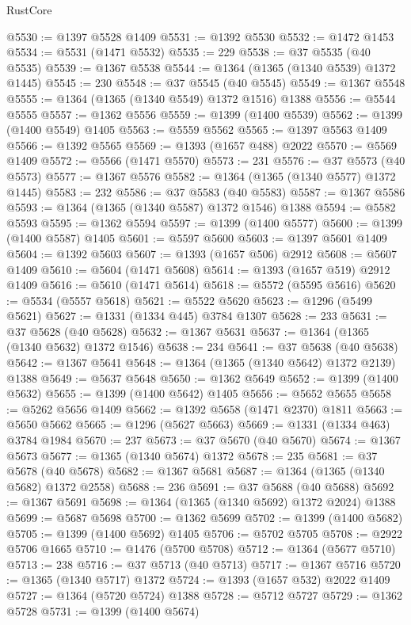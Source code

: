 \begin{lexlean}{RustCore}
\begin{coremodule}
@5530 := @1397 @5528 @1409
@5531 := @1392 @5530
@5532 := @1472 @1453
@5534 := @5531 (@1471 @5532)
@5535 := 229
@5538 := @37 @5535 (@40 @5535)
@5539 := @1367 @5538
@5544 := @1364 (@1365 (@1340 @5539) @1372 @1445)
@5545 := 230
@5548 := @37 @5545 (@40 @5545)
@5549 := @1367 @5548
@5555 := @1364 (@1365 (@1340 @5549) @1372 @1516) @1388
@5556 := @5544 @5555
@5557 := @1362 @5556
@5559 := @1399 (@1400 @5539)
@5562 := @1399 (@1400 @5549) @1405
@5563 := @5559 @5562
@5565 := @1397 @5563 @1409
@5566 := @1392 @5565
@5569 := @1393 (@1657 @488) @2022
@5570 := @5569 @1409
@5572 := @5566 (@1471 @5570)
@5573 := 231
@5576 := @37 @5573 (@40 @5573)
@5577 := @1367 @5576
@5582 := @1364 (@1365 (@1340 @5577) @1372 @1445)
@5583 := 232
@5586 := @37 @5583 (@40 @5583)
@5587 := @1367 @5586
@5593 := @1364 (@1365 (@1340 @5587) @1372 @1546) @1388
@5594 := @5582 @5593
@5595 := @1362 @5594
@5597 := @1399 (@1400 @5577)
@5600 := @1399 (@1400 @5587) @1405
@5601 := @5597 @5600
@5603 := @1397 @5601 @1409
@5604 := @1392 @5603
@5607 := @1393 (@1657 @506) @2912
@5608 := @5607 @1409
@5610 := @5604 (@1471 @5608)
@5614 := @1393 (@1657 @519) @2912 @1409
@5616 := @5610 (@1471 @5614)
@5618 := @5572 (@5595 @5616)
@5620 := @5534 (@5557 @5618)
@5621 := @5522 @5620
@5623 := @1296 (@5499 @5621)
@5627 := @1331 (@1334 @445) @3784 @1307
@5628 := 233
@5631 := @37 @5628 (@40 @5628)
@5632 := @1367 @5631
@5637 := @1364 (@1365 (@1340 @5632) @1372 @1546)
@5638 := 234
@5641 := @37 @5638 (@40 @5638)
@5642 := @1367 @5641
@5648 := @1364 (@1365 (@1340 @5642) @1372 @2139) @1388
@5649 := @5637 @5648
@5650 := @1362 @5649
@5652 := @1399 (@1400 @5632)
@5655 := @1399 (@1400 @5642) @1405
@5656 := @5652 @5655
@5658 := @5262 @5656 @1409
@5662 := @1392 @5658 (@1471 @2370) @1811
@5663 := @5650 @5662
@5665 := @1296 (@5627 @5663)
@5669 := @1331 (@1334 @463) @3784 @1984
@5670 := 237
@5673 := @37 @5670 (@40 @5670)
@5674 := @1367 @5673
@5677 := @1365 (@1340 @5674) @1372
@5678 := 235
@5681 := @37 @5678 (@40 @5678)
@5682 := @1367 @5681
@5687 := @1364 (@1365 (@1340 @5682) @1372 @2558)
@5688 := 236
@5691 := @37 @5688 (@40 @5688)
@5692 := @1367 @5691
@5698 := @1364 (@1365 (@1340 @5692) @1372 @2024) @1388
@5699 := @5687 @5698
@5700 := @1362 @5699
@5702 := @1399 (@1400 @5682)
@5705 := @1399 (@1400 @5692) @1405
@5706 := @5702 @5705
@5708 := @2922 @5706 @1665
@5710 := @1476 (@5700 @5708)
@5712 := @1364 (@5677 @5710)
@5713 := 238
@5716 := @37 @5713 (@40 @5713)
@5717 := @1367 @5716
@5720 := @1365 (@1340 @5717) @1372
@5724 := @1393 (@1657 @532) @2022 @1409
@5727 := @1364 (@5720 @5724) @1388
@5728 := @5712 @5727
@5729 := @1362 @5728
@5731 := @1399 (@1400 @5674)

\end{coremodule}
\end{lexlean}
